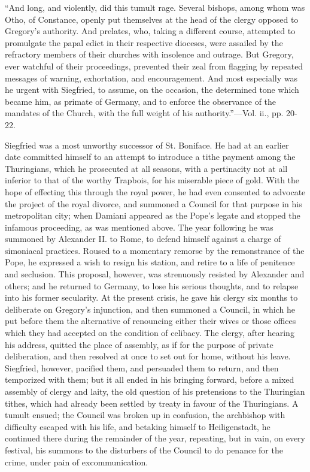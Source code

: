 ``And
long, and violently, did this tumult rage. Several bishops, among whom
was Otho, of Constance, openly put themselves at the head of the
clergy opposed to Gregory's authority. And prelates, who, taking a
different course, attempted to promulgate the papal edict in their
respective dioceses, were assailed by the refractory members of their
churches with insolence and outrage. But Gregory, ever watchful of
their proceedings, prevented their zeal from flagging by repeated
messages of warning, exhortation, and encouragement. And most
especially was he urgent with Siegfried, to assume, on the occasion,
the determined tone which became him, as primate of Germany, and to
enforce the observance of the mandates of the Church, with the full
weight of his authority.''—Vol. ii., pp. 20-22.

Siegfried was a most unworthy successor of St.
Boniface. He had at an earlier date committed himself to an attempt to
introduce a tithe payment among the Thuringians, which he prosecuted
at all seasons, with a pertinacity not at all inferior to that
of the worthy Trapbois, for his miserable piece of gold. With the hope
of effecting this through the royal power, he had even consented to
advocate the project of the royal divorce, and summoned a Council for
that purpose in his metropolitan city; when Damiani appeared as the
Pope's legate and stopped the infamous proceeding, as was mentioned
above. The year following he was summoned by Alexander II. to Rome, to
defend himself against a charge of simoniacal practices. Roused to a
momentary remorse by the remonstrance of the Pope, he expressed a wish
to resign his station, and retire to a life of penitence and
seclusion. This proposal, however, was strenuously resisted by
Alexander and others; and he returned to Germany, to lose his serious
thoughts, and to relapse into his former secularity. At the present
crisis, he gave his clergy six months to deliberate on Gregory's
injunction, and then summoned a Council, in which he put before them
the alternative of renouncing either their wives or those offices
which they had accepted on the condition of celibacy. The clergy,
after hearing his address, quitted the place of assembly, as if for
the purpose of private deliberation, and then resolved at once to set
out for home, without his leave. Siegfried, however, pacified them,
and persuaded them to return, and then temporized with them; but it
all ended in his bringing forward, before a mixed assembly of clergy
and laity, the old question of his pretensions to the Thuringian
tithes, which had already been settled by treaty in favour of the
Thuringians. A tumult ensued; the Council was broken up in confusion,
the archbishop with difficulty escaped with his life, and betaking
himself to Heiligenstadt, he continued there during the remainder of
the year, repeating, but in vain, on every festival, his summons
to the disturbers of the Council to do penance for the crime, under
pain of excommunication.

